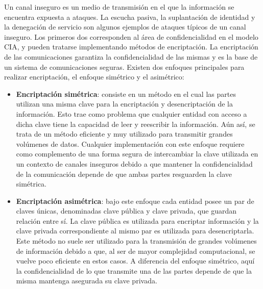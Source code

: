 Un canal inseguro es un medio de transmisión en el que la información se encuentra expuesta a ataques. La escucha pasiva, la suplantación de identidad y la denegación de servicio son algunos ejemplos de ataques típicos de un canal inseguro. Los primeros dos corresponden al área de confidencialidad en el modelo CIA, y pueden tratarse implementando métodos de encriptación.
La encriptación de las comunicaciones garantiza la confidencialidad de las mismas y es la base de un sistema de comunicaciones seguras. Existen dos enfoques principales para realizar encriptación, el enfoque simétrico y el asimétrico:

\begin{itemize}
    \item \textbf{Encriptación simétrica}: consiste en un método en el cual las partes utilizan una misma clave para la encriptación y desencriptación de la información. Esto trae como problema que cualquier entidad con acceso a dicha clave tiene la capacidad de leer y reescribir la información. Aún así, se trata de un método eficiente y muy utilizado para transmitir grandes volúmenes de datos. Cualquier implementación con este enfoque requiere como complemento de una forma segura de intercambiar la clave utilizada en un contexto de canales inseguros debido a que mantener la confidencialidad de la comunicación depende de que ambas partes resguarden la clave simétrica.
    
    \item \textbf{Encriptación asimétrica}: bajo este enfoque cada entidad posee un par de claves únicas, denominadas clave pública y clave privada, que guardan relación entre sí. La clave pública es utilizada para encriptar información y la clave privada correspondiente al mismo par es utilizada para desencriptarla. Este método no suele ser utilizado para la transmisión de grandes volúmenes de información debido a que, al ser de mayor complejidad computacional, se vuelve poco eficiente en estos casos. A diferencia del enfoque simétrico, aquí la confidencialidad de lo que transmite una de las partes depende de que la misma mantenga asegurada su clave privada.
\end{itemize}

